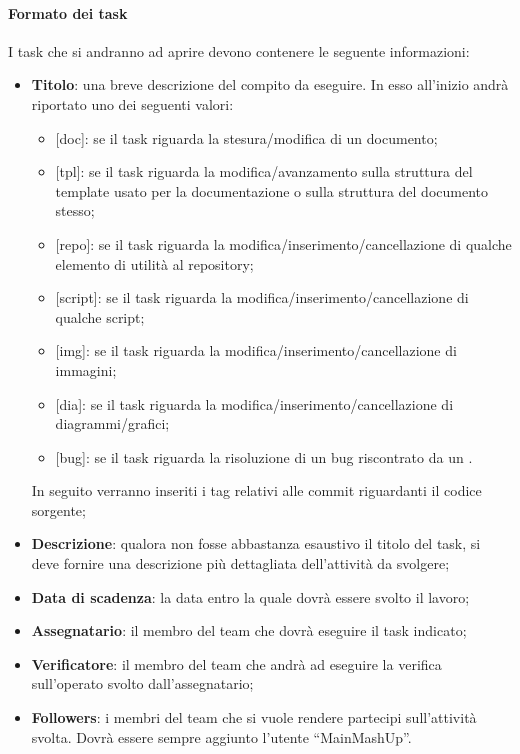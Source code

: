 			\paragraph{Formato dei task}
			\label{par:formato_dei_task}
			I task che si andranno ad aprire devono contenere le seguente informazioni:
				\begin{itemize}
					\item \textbf{Titolo}: una breve descrizione del compito da eseguire. In esso all'inizio andrà riportato uno dei seguenti valori:
						\begin{itemize}
							\item {[}doc{]}: se il task riguarda la stesura/modifica di un documento;
							\item {[}tpl{]}: se il task riguarda la modifica/avanzamento sulla struttura del template usato per la documentazione o sulla struttura del documento stesso;
							\item {[}repo{]}: se il task riguarda la modifica/inserimento/cancellazione di qualche elemento di utilità al repository;
							\item {[}script{]}: se il task riguarda la modifica/inserimento/cancellazione di qualche script;
							\item {[}img{]}: se il task riguarda la modifica/inserimento/cancellazione di immagini;
							\item {[}dia{]}: se il task riguarda la modifica/inserimento/cancellazione di diagrammi/grafici;
							\item {[}bug{]}: se il task riguarda la risoluzione di un bug riscontrato da un \roleVerifier.
						\end{itemize}
						\noindent
						In seguito verranno inseriti i tag relativi alle commit riguardanti il codice sorgente;
						
					\item \textbf{Descrizione}: qualora non fosse abbastanza esaustivo il titolo del task, si deve fornire una descrizione più dettagliata dell'attività da svolgere;
					\item \textbf{Data di scadenza}: la data entro la quale dovrà essere svolto il lavoro;
					\item \textbf{Assegnatario}: il membro del team che dovrà eseguire il task indicato;
					\item \textbf{Verificatore}: il membro del team che andrà ad eseguire la verifica sull'operato svolto dall'assegnatario;
					\item \textbf{Followers}: i membri del team che si vuole rendere partecipi sull'attività svolta. Dovrà essere sempre aggiunto l'utente ``MainMashUp''.
				\end{itemize}
